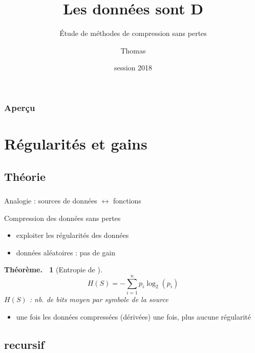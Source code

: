 \documentclass{beamer}
\title{Les données sont D\tss{1}}
\subtitle{\'Etude de méthodes de compression sans pertes}
\author{Thomas \sc{Bagrel}}
\institute{Lycée Henri \sc{Poincaré}, Nancy}
\date{\sc{tipe} session 2018}
\newcommand{\tech}[1]{{\small \sc{#1}}}
\newcommand{\relief}[1]{{\color{structureTextColor} #1}}
\theoremstyle{theoreme}
\newtheorem{theoreme}{Théorème.~}
\begin{document}


\begin{frame}
  \titlepage{}
\end{frame}

\begin{frame}
  \frametitle{Aperçu}

  \tableofcontents %
\end{frame}

\section{Régularités et gains}

\subsection{Théorie}

\begin{frame}
  \frametitle{\secname{}}
  \framesubtitle{\subsecname{}}

  Analogie : sources de données $\leftrightarrow$ fonctions
  \smallskip\pause

  \relief{Compression des données sans pertes}
  \begin{itemize}
    \item \pause exploiter les régularités des données
    \item \pause données aléatoires : pas de gain
  \end{itemize}

  \pause
  \begin{theoreme}[Entropie de ]
  \[
    H(S) = -\sum_{i = 1}^n p_i \log_2(p_i)
  \]
  {\footnotesize $H(S)$ : nb. de bits moyen par symbole de la source }
  \end{theoreme}
  \begin{itemize}
    \item \pause une fois les données compressées (dérivées) une fois, plus aucune régularité
  \end{itemize}
\end{frame}

\subsection{\tech{zip} recursif}
\end{document}
